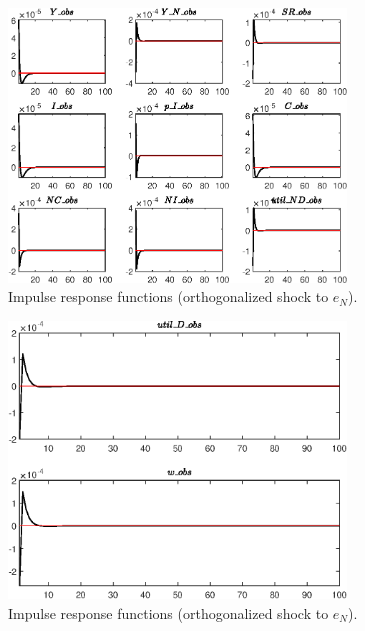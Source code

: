 \begin{figure}[H]
\centering 
\includegraphics[width=0.80\textwidth]{RBC_sectoral/graphs/RBC_sectoral_IRF_e_N1}
\caption{Impulse response functions (orthogonalized shock to ${e_N}$).}\label{Fig:IRF:e_N:1}
\end{figure}
 
\begin{figure}[H]
\centering 
\includegraphics[width=0.80\textwidth]{RBC_sectoral/graphs/RBC_sectoral_IRF_e_N2}
\caption{Impulse response functions (orthogonalized shock to ${e_N}$).}\label{Fig:IRF:e_N:2}
\end{figure}
 

